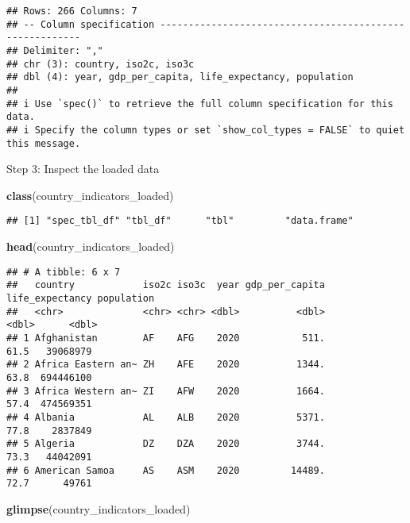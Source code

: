 \documentclass[
]{article}
\newenvironment{Shaded}{\begin{snugshade}}{\end{snugshade}}
\newcommand{\FunctionTok}[1]{\textcolor[rgb]{0.13,0.29,0.53}{\textbf{#1}}}
\newcommand{\NormalTok}[1]{#1}
\begin{document}
\begin{verbatim}
## Rows: 266 Columns: 7
## -- Column specification --------------------------------------------------------
## Delimiter: ","
## chr (3): country, iso2c, iso3c
## dbl (4): year, gdp_per_capita, life_expectancy, population
## 
## i Use `spec()` to retrieve the full column specification for this data.
## i Specify the column types or set `show_col_types = FALSE` to quiet this message.
\end{verbatim}

Step 3: Inspect the loaded data

\begin{Shaded}
\begin{Highlighting}[]
\FunctionTok{class}\NormalTok{(country\_indicators\_loaded)}
\end{Highlighting}
\end{Shaded}

\begin{verbatim}
## [1] "spec_tbl_df" "tbl_df"      "tbl"         "data.frame"
\end{verbatim}

\begin{Shaded}
\begin{Highlighting}[]
\FunctionTok{head}\NormalTok{(country\_indicators\_loaded)}
\end{Highlighting}
\end{Shaded}

\begin{verbatim}
## # A tibble: 6 x 7
##   country            iso2c iso3c  year gdp_per_capita life_expectancy population
##   <chr>              <chr> <chr> <dbl>          <dbl>           <dbl>      <dbl>
## 1 Afghanistan        AF    AFG    2020           511.            61.5   39068979
## 2 Africa Eastern an~ ZH    AFE    2020          1344.            63.8  694446100
## 3 Africa Western an~ ZI    AFW    2020          1664.            57.4  474569351
## 4 Albania            AL    ALB    2020          5371.            77.8    2837849
## 5 Algeria            DZ    DZA    2020          3744.            73.3   44042091
## 6 American Samoa     AS    ASM    2020         14489.            72.7      49761
\end{verbatim}

\begin{Shaded}
\begin{Highlighting}[]
\FunctionTok{glimpse}\NormalTok{(country\_indicators\_loaded)}
\end{Highlighting}
\end{Shaded}
\end{document}
